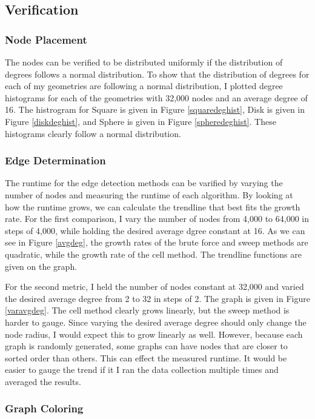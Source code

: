 \documentclass{article}
\begin{document}
    \subsection{Verification}

        \subsubsection{Node Placement}
        The nodes can be verified to be distributed uniformly if the distribution of degrees follows a normal distribution. To show that the distribution of degrees for each of my geometries are following a normal distribution, I plotted degree histograms for each of the geometries with 32,000 nodes and an average degree of 16. The histrogram for Square is given in Figure \ref{squaredeghist}, Disk is given in Figure \ref{diskdeghist}, and Sphere is given in Figure \ref{spheredeghist}. These histograms clearly follow a normal distribution.

        \subsubsection{Edge Determination}
        The runtime for the edge detection methods can be varified by varying the number of nodes and measuring the runtime of each algorithm. By looking at how the runtime grows, we can calculate the trendline that best fits the growth rate. For the first comparison, I vary the number of nodes from 4,000 to 64,000 in steps of 4,000, while holding the desired average dgree constant at 16. As we can see in Figure \ref{avgdeg}, the growth rates of the brute force and sweep methods are quadratic, while the growth rate of the cell method. The trendline functions are given on the graph.
        \par
        For the second metric, I held the number of nodes constant at 32,000 and varied the desired average degree from 2 to 32 in steps of 2. The graph is given in Figure \ref{varavgdeg}. The cell method clearly grows linearly, but the sweep method is harder to gauge. Since varying the desired average degree should only change the node radius, I would expect this to grow linearly as well. However, because each graph is randomly generated, some graphs can have nodes that are closer to sorted order than others. This can effect the measured runtime. It would be easier to gauge the trend if it I ran the data collection multiple times and averaged the results.

        \subsubsection{Graph Coloring}
\end{document}
